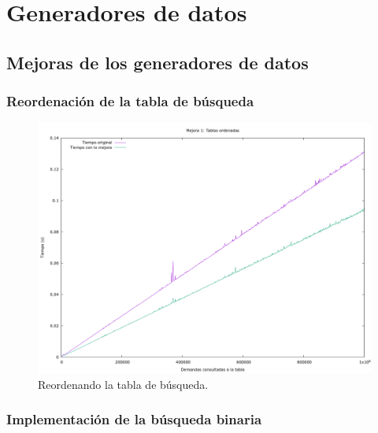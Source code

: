 \documentclass[12pt, spanish]{article}
\begin{document}
\section{Generadores de datos}

\subsection{Mejoras de los generadores de datos}

\subsubsection{Reordenación de la tabla de búsqueda}

\begin{figure}[H]
	\centering
	\includegraphics[scale = 0.3]{t_mejora1.png}
	\caption{Reordenando la tabla de búsqueda.}
	\label{fig:ej1_a_150000}

\end{figure}


\subsubsection{Implementación de la búsqueda binaria}
\end{document}
